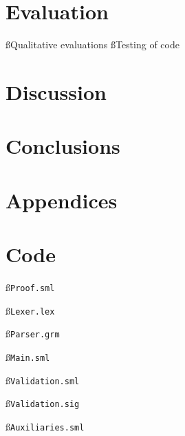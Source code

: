 \documentclass[a4paper]{article}
\begin{document}
\section{Evaluation}
\ss{Qualitative evaluations}
\ss{Testing of code}

\section{Discussion}

\section{Conclusions}


\label{LastBody}
\pagebreak
{}


\label{LastBio}
\pagebreak
\appendix
{}
\section*{Appendices}\label{FirstApp}
\renewcommand \thesubsection{\alph{subsection}}
\section{Code}
\ss{\tt{Proof.sml}}\label{Proof}

\ss{\tt{Lexer.lex}}\label{Lexer}

\ss{\tt{Parser.grm}}\label{Parser}

\ss{\tt{Main.sml}}\label{Main}

\ss{\tt{Validation.sml}}\label{Validation}

\ss{\tt{Validation.sig}}\label{Validation}

\ss{\tt{Auxiliaries.sml}}\label{Auxiliaries}

\label{LastApp}
\label{LastPage}
\end{document}
